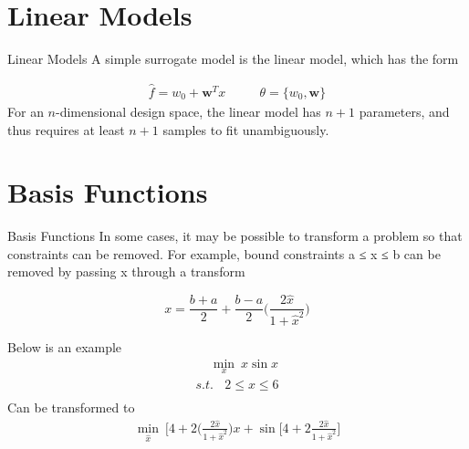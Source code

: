 \documentclass{beamer}
\begin{document}
\section{Linear Models}
\begin{frame}{Linear Models}
A simple surrogate model is the linear model, which has the form

\begin{gather*}
    \hat{f} = w_0 + \boldsymbol{w}^T x ~~~~~~~~~~~~ \theta= \{w_0, \boldsymbol{w}\}
\end{gather*}
For an $n$-dimensional design space, the linear model has $n+1$ parameters, and thus requires at least $n+1$ samples to fit unambiguously.

\end{frame}

\section{Basis Functions}
\begin{frame}{Basis Functions}
In some cases, it may be possible to transform a problem so that constraints can be removed. For example, bound constraints a ≤ x ≤ b can be removed by passing x through a transform

\begin{equation*}
x = \frac{b+a}{2} + \frac{b-a}{2}\bigg(\frac{2\hat{x}}{1+\hat{x}^2}\bigg)
\end{equation*}

Below is an example
\begin{gather*}
    ~~~~~ \underset{x}{\min} ~ x\sin{x}\\
    {s.t.}~~~~ 2\leq x \leq 6 \\
\end{gather*}
Can be transformed to 
\begin{gather*}
    \underset{\hat{x}}{\min} ~ \bigg[4+2\bigg(\frac{2\hat{x}}{1+\hat{x}^2}\bigg)x
    + \sin \bigg[ 4 + 2\frac{2\hat{x}}{1+\hat{x}^2}\bigg]
\end{gather*}

\end{frame}
\end{document}
